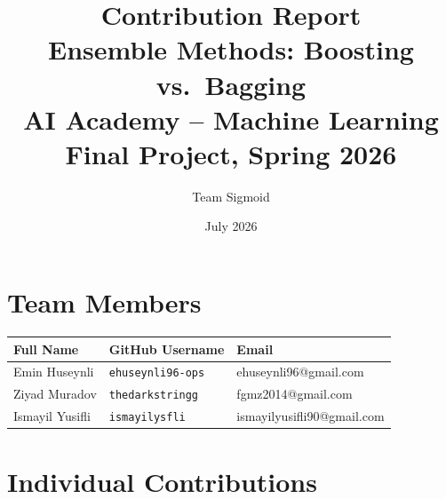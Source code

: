 \documentclass[11pt,a4paper]{article}
\title{\textbf{Contribution Report}\\[0.5em]
       \large Ensemble Methods: Boosting vs.\ Bagging\\
       AI Academy -- Machine Learning Final Project, Spring 2026}
\author{Team Sigmoid}
\date{July 2026}
\begin{document}
\maketitle

\section*{Team Members}

\begin{center}
\begin{tabular}{lll}
\toprule
\textbf{Full Name} & \textbf{GitHub Username} & \textbf{Email} \\
\midrule
Emin Huseynli   & \texttt{ehuseynli96-ops} & ehuseynli96@gmail.com \\
Ziyad Muradov   & \texttt{thedarkstringg}  & fgmz2014@gmail.com \\
Ismayil Yusifli & \texttt{ismayilysfli}    & ismayilyusifli90@gmail.com \\
\bottomrule
\end{tabular}
\end{center}

\section*{Individual Contributions}
\end{document}
